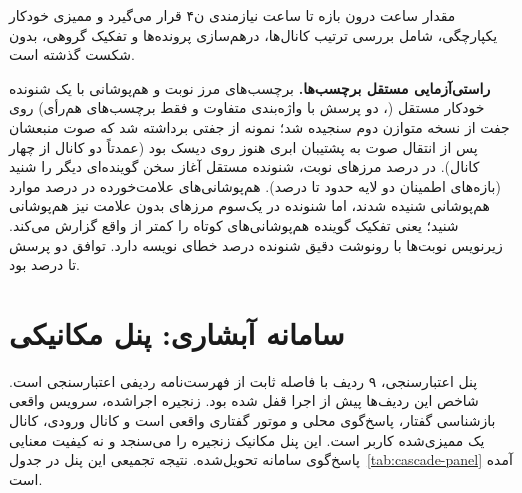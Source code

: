 مقدار  ساعت درون بازه  تا  ساعت نیازمندی ن۴ قرار
می‌گیرد و ممیزی خودکار یکپارچگی، شامل بررسی ترتیب کانال‌ها، درهم‌سازی
پرونده‌ها و تفکیک گروهی، بدون شکست گذشته است.

\textbf{راستی‌آزمایی مستقل برچسب‌ها.} برچسب‌های مرز نوبت و هم‌پوشانی با یک
شنونده خودکار مستقل (، دو پرسش با واژه‌بندی متفاوت و فقط
برچسب‌های هم‌رأی) روی  جفت از نسخه متوازن دوم سنجیده شد؛ نمونه از
 جفتی برداشته شد که صوت منبعشان پس از انتقال صوت به پشتیبان ابری
هنوز روی دیسک بود (عمدتاً دو کانال از چهار کانال). در  درصد مرزهای
نوبت، شنونده مستقل آغاز سخن گوینده‌ای دیگر را شنید (بازه‌های اطمینان دو لایه
حدود  تا  درصد). هم‌پوشانی‌های علامت‌خورده در  درصد موارد
هم‌پوشانی شنیده شدند، اما شنونده در یک‌سوم مرزهای بدون علامت نیز هم‌پوشانی
شنید؛ یعنی تفکیک گوینده هم‌پوشانی‌های کوتاه را کمتر از واقع گزارش می‌کند.
زیرنویس نوبت‌ها با رونوشت دقیق شنونده  درصد خطای نویسه دارد. توافق دو
پرسش  تا  درصد بود.


\section{سامانه آبشاری: پنل مکانیکی}
\label{sec:res-cascade}

پنل اعتبارسنجی، ۹ ردیف با فاصله ثابت از فهرست‌نامه  ردیفی
اعتبارسنجی است. شاخص این ردیف‌ها پیش از اجرا قفل شده بود. زنجیره
اجرا‌شده، سرویس واقعی بازشناسی گفتار، پاسخ‌گوی محلی
 و موتور گفتاری واقعی است و کانال ورودی، کانال
یک ممیزی‌شده کاربر است. این پنل مکانیک زنجیره را می‌سنجد و نه کیفیت
معنایی پاسخ‌گوی  سامانه تحویل‌شده. نتیجه تجمیعی این پنل در
جدول~\ref{tab:cascade-panel} آمده است.

